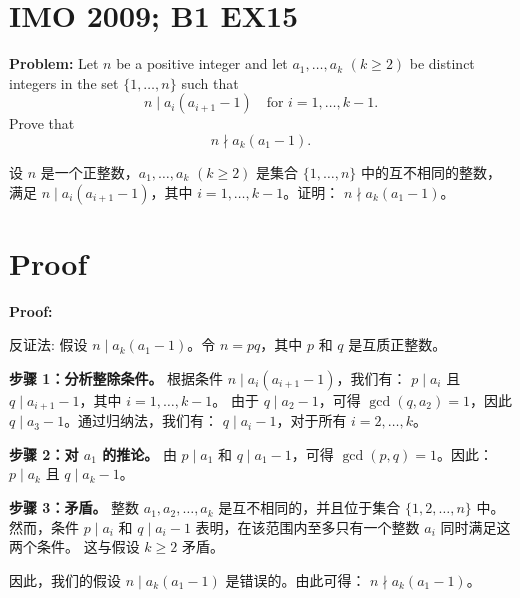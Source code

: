 \documentclass[a4paper]{article}
\begin{document}
\section*{IMO 2009; B1 EX15}
    \textbf{Problem:}
    Let $n$ be a positive integer and let $a_1,\ldots,a_k$ $(k \geq 2)$ be distinct integers in the set $\{1,\ldots,n\}$ such that 
    \[n \mid a_i(a_{i+1}-1) \quad \text{for } i = 1,\ldots,k-1.\]
    Prove that 
    \[n \nmid a_k(a_1-1).\]

    \[ \]
    设 $n$ 是一个正整数，$a_1, \ldots, a_k$ $(k \geq 2)$ 是集合 $\{1, \ldots, n\}$ 中的互不相同的整数，满足
    $n \mid a_i(a_{i+1}-1)$，其中 $i = 1, \ldots, k-1$。证明：
    $n \nmid a_k(a_1-1)$。


\section*{Proof}
    \textbf{Proof:}

    反证法: 假设 $n \mid a_k(a_1-1)$。令 $n = pq$，其中 $p$ 和 $q$ 是互质正整数。

    \textbf{步骤 1：分析整除条件。}  
    根据条件 $n \mid a_i(a_{i+1}-1)$，我们有：
    $p \mid a_i$ 且 $q \mid a_{i+1}-1$，其中 $i = 1, \ldots, k-1$。
    由于 $q \mid a_2-1$，可得 $\gcd(q, a_2) = 1$，因此 $q \mid a_3-1$。通过归纳法，我们有：
    $q \mid a_i-1$，对于所有 $i = 2, \ldots, k$。

    \textbf{步骤 2：对 $a_1$ 的推论。}  
    由 $p \mid a_1$ 和 $q \mid a_1-1$，可得 $\gcd(p, q) = 1$。因此：
    $p \mid a_k$ 且 $q \mid a_k-1$。

    \textbf{步骤 3：矛盾。}  
    整数 $a_1, a_2, \ldots, a_k$ 是互不相同的，并且位于集合 $\{1, 2, \ldots, n\}$ 中。
    然而，条件 $p \mid a_i$ 和 $q \mid a_i-1$ 表明，在该范围内至多只有一个整数 $a_i$ 同时满足这两个条件。
    这与假设 $k \geq 2$ 矛盾。

    因此，我们的假设 $n \mid a_k(a_1-1)$ 是错误的。由此可得：
    $n \nmid a_k(a_1-1)$。
\end{document}
